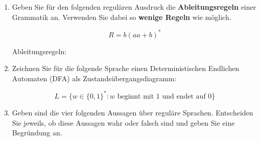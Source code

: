 \begin{enumerate}
  \item {
    Geben Sie für den folgenden regulären Ausdruck die \textbf{Ableitungsregeln}
    einer Grammatik an.
    Verwenden Sie dabei so \textbf{wenige Regeln} wie möglich.

    \[
      R = b(aa + b)^*
    \]

    \vspace{10pt}

    Ableitungsregeln:
    \solution{
      \[
        S \to bA, \; A \to bA|aB|\varepsilon, \; B \to aA
      \]
    }{}
  }
  \vspace{\fill}
  \item {
    Zeichnen Sie für die folgende Sprache einen Deterministischen Endlichen
    Automaten (DFA) als Zustandsübergangsdiagramm:

    \[
      L = \{w \in \{0, 1\}^*\mathbin{:} w \text{~beginnt mit 1 und endet auf 0}\}
    \]

  }
  \newpage
  \item {
    Geben sind die vier folgenden Aussagen über reguläre Sprachen.
    Entscheiden Sie jeweils, ob diese Aussagen wahr oder falsch sind und geben
    Sie eine Begründung an.

}
\end{enumerate}
